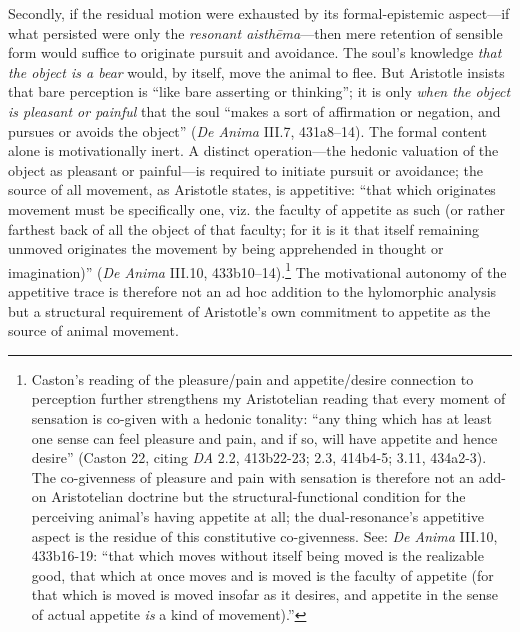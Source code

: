 Secondly, if the residual motion were exhausted by its formal-epistemic aspect---if what persisted were only the \textit{resonant aisthēma}---then mere retention of sensible form would suffice to originate pursuit and avoidance. The soul's knowledge \textit{that the object is a bear} would, by itself, move the animal to flee. But Aristotle insists that bare perception is ``like bare asserting or thinking''; it is only \textit{when the object is pleasant or painful} that the soul ``makes a sort of affirmation or negation, and pursues or avoids the object'' (\textit{De Anima} III.7, 431a8--14). The formal content alone is motivationally inert. A distinct operation---the hedonic valuation of the object as pleasant or painful---is required to initiate pursuit or avoidance; the source of all movement, as Aristotle states, is appetitive: ``that which originates movement must be specifically one, viz. the faculty of appetite as such (or rather farthest back of all the object of that faculty; for it is it that itself remaining unmoved originates the movement by being apprehended in thought or imagination)'' (\textit{De Anima} III.10, 433b10--14).\footnote{Caston's reading of the pleasure/pain and appetite/desire connection to perception further strengthens my Aristotelian reading that every moment of sensation is co-given with a hedonic tonality: ``any thing which has at least one sense can feel pleasure and pain, and if so, will have appetite and hence desire'' (Caston 22, citing \textit{DA} 2.2, 413b22-23; 2.3, 414b4-5; 3.11, 434a2-3). The co-givenness of pleasure and pain with sensation is therefore not an add-on Aristotelian doctrine but the structural-functional condition for the perceiving animal's having appetite at all; the dual-resonance's appetitive aspect is the residue of this constitutive co-givenness. See: \textit{De Anima} III.10, 433b16-19: ``that which moves without itself being moved is the realizable good, that which at once moves and is moved is the faculty of appetite (for that which is moved is moved insofar as it desires, and appetite in the sense of actual appetite \textit{is} a kind of movement).''} The motivational autonomy of the appetitive trace is therefore not an ad hoc addition to the hylomorphic analysis but a structural requirement of Aristotle's own commitment to appetite as the source of animal movement.

